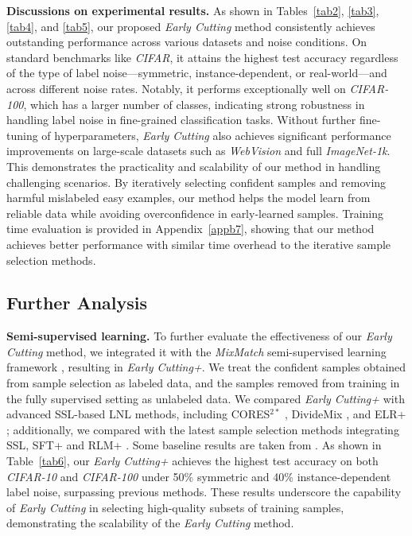 \textbf{Discussions on experimental results.}
As shown in Tables~\ref{tab2}, \ref{tab3}, \ref{tab4}, and \ref{tab5}, our proposed \emph{Early Cutting} method consistently achieves outstanding performance across various datasets and noise conditions. On standard benchmarks like \emph{CIFAR}, it attains the highest test accuracy regardless of the type of label noise—symmetric, instance-dependent, or real-world—and across different noise rates. Notably, it performs exceptionally well on \emph{CIFAR-100}, which has a larger number of classes, indicating strong robustness in handling label noise in fine-grained classification tasks.
Without further fine-tuning of hyperparameters, \emph{Early Cutting} also achieves significant performance improvements on large-scale datasets such as \emph{WebVision} and full \emph{ImageNet-1k}. This demonstrates the practicality and scalability of our method in handling challenging scenarios.
By iteratively selecting confident samples and removing harmful mislabeled easy examples, our method helps the model learn from reliable data while avoiding overconfidence in early-learned samples. 
Training time evaluation is provided in Appendix~\ref{appb7}, showing that our method achieves better performance with similar time overhead to the iterative sample selection methods.


\subsection{Further Analysis}
\label{section:4_3}
\textbf{Semi-supervised learning.}
To further evaluate the effectiveness of our \emph{Early Cutting} method, we integrated it with the \emph{MixMatch} semi-supervised learning framework \cite{berthelot2019mixmatch}, resulting in \emph{Early Cutting+}. We treat the confident samples obtained from sample selection as labeled data, and the samples removed from training in the fully supervised setting as unlabeled data. We compared \emph{Early Cutting+} with advanced SSL-based LNL methods, including CORES$^{2*}$ \cite{cheng2020learning}, DivideMix \cite{li2020dividemix}, and ELR+ \cite{liu2020early}; additionally, we compared with the latest sample selection methods integrating SSL, SFT+ \cite{wei2022self} and RLM+ \cite{li2024regroup}. Some baseline results are taken from \citet{wei2022self}.
As shown in Table~\ref{tab6}, our \emph{Early Cutting+} achieves the highest test accuracy on both \emph{CIFAR-10} and \emph{CIFAR-100} under 50\% symmetric and 40\% instance-dependent label noise, surpassing previous methods. These results underscore the capability of \emph{Early Cutting} in selecting high-quality subsets of training samples, demonstrating the scalability of the \emph{Early Cutting} method.

